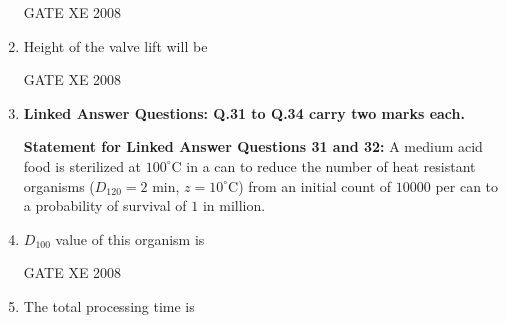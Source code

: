 \documentclass[12pt]{article}
\begin{document}
\begin{enumerate}[label=Q\arabic*.]
GATE XE 2008  

\item Height of the valve lift will be  

\begin{enumerate}[label=(\Alph*)]
\end{enumerate}

GATE XE 2008  

\item[] \textbf{\Large Linked Answer Questions: Q.31 to Q.34 carry two marks each.}

  
\textbf{ Statement for Linked Answer Questions 31 and 32:  }
A medium acid food is sterilized at $100^\circ$C in a can to reduce the number of heat resistant organisms ($D_{120} = 2$ min, $z = 10^\circ$C) from an initial count of $10000$ per can to a probability of survival of $1$ in million.  

\item $D_{100}$ value of this organism is 

\begin{enumerate}[label=(\Alph*)]
\end{enumerate}

GATE XE 2008  

\item The total processing time is  

\begin{enumerate}[label=(\Alph*)]
\end{enumerate}


\end{enumerate}
\end{document}

